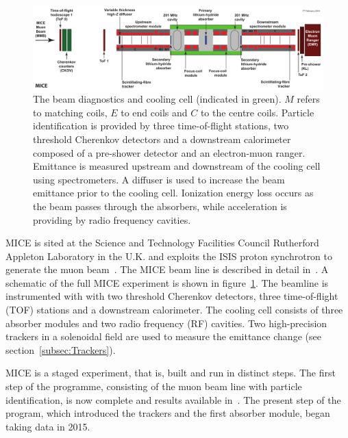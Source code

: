   \begin{figure}[bht]
    \begin{center}
      \includegraphics[width=1.0\linewidth]{01-MICE/Cooling-demo-labels.pdf}
      \caption{\label{fig:CoolingChannel} The beam diagnostics and cooling cell (indicated in green). $M$ refers to matching coils, $E$ to end coils and $C$ to the centre coils. Particle identification is provided by three time-of-flight stations, two threshold Cherenkov detectors and a downstream calorimeter composed of a pre-shower detector and an electron-muon ranger. Emittance is measured upstream and downstream of the cooling cell using spectrometers. A diffuser is used to increase the beam emittance prior to the cooling cell. Ionization energy loss occurs as the beam passes through the absorbers, while acceleration is providing by radio frequency cavities.}
    \end{center}
  \end{figure}

  MICE is sited at the Science and Technology Facilities Council Rutherford Appleton Laboratory in the U.K. and exploits the ISIS proton synchrotron to generate the muon beam~\cite{MiceTarget}.  The MICE beam line is described in detail in~\cite{BeamlineJINST}. A schematic of the full MICE experiment is shown in figure~\ref{fig:CoolingChannel}. The beamline is instrumented with with two threshold Cherenkov detectors, three time-of-flight (TOF) stations and a downstream calorimeter. The cooling cell consists of three absorber modules and two radio frequency (RF) cavities. Two high-precision trackers in a solenoidal field are used to measure the emittance change (see section~\ref{subsec:Trackers}).

  MICE is a staged experiment, that is, built and run in distinct steps. The first step of the programme, consisting of the muon beam line with particle identification, is now complete and results available in~\cite{BeamlineJINST, BeamCharacterisationEurPhysJ, EMRJINST, PionContaminationJINST}. The present step of the program, which introduced the trackers and the first absorber module, began taking data in 2015. %

